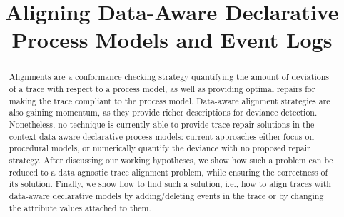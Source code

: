 \documentclass[runningheads]{llncs}
\begin{document}
%
\title{Aligning Data-Aware Declarative Process Models and Event Logs}
%
%

%
%
%
\maketitle              %
%
\begin{abstract}
Alignments are a conformance checking strategy quantifying the amount of deviations of a trace with respect to a process model, as well as providing optimal repairs for making the trace compliant to the process model. Data-aware alignment strategies are also gaining momentum, as they provide richer descriptions for deviance detection. Nonetheless, no technique is currently able to provide trace repair solutions in the context data-aware declarative process models: current approaches either focus on procedural models, or numerically quantify the deviance with no proposed repair strategy. After discussing our working hypotheses, we show how such a problem can be reduced to a data agnostic trace alignment problem, while ensuring the correctness of its solution. Finally, we show how to find such a solution, i.e., how to align traces with data-aware declarative models by adding/deleting events in the trace or by changing the attribute values attached to them.

\end{abstract}


%
\end{document}
